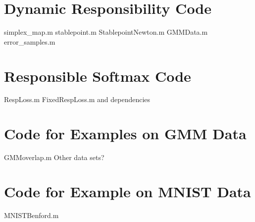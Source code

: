 \section{Dynamic Responsibility Code}
simplex_map.m
stablepoint.m
StablepointNewton.m
GMMData.m
error_samples.m
\section{Responsible Softmax Code}
RespLoss.m 
FixedRespLoss.m
and dependencies
\section{Code for Examples on GMM Data}
GMMoverlap.m 
Other data sets?
\section{Code for Example on MNIST Data}
MNISTBenford.m